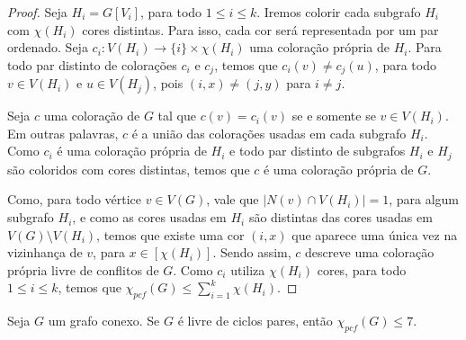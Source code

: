 \documentclass[12pt]{article}
\begin{document}
\begin{proof}
	
 Seja $H_i = G[V_i]$, para todo $1 \leq i \leq k$. Iremos colorir cada subgrafo $H_i$ com $\chi(H_i)$ cores distintas. Para isso, cada cor será representada por um par ordenado. Seja $c_i: V(H_i) \rightarrow \{ i \} \times \chi(H_i)$ uma coloração própria de $H_i$. Para todo par distinto de colorações $c_i$ e $c_j$, temos que $c_i(v) \neq c_j(u)$, para todo $ v \in V(H_i)$ e $ u \in V(H_j)$, pois $(i, x) \neq (j, y)$ para $i \neq j$.\newl
  
  Seja $c$ uma coloração de $G$ tal que $c(v) = c_i(v)$ se e somente se $v \in V(H_i)$. Em outras palavras, $c$ é a união das colorações usadas em cada subgrafo $H_i$. Como $c_i$ é uma coloração própria de $H_i$ e todo par distinto de subgrafos $H_i$ e $H_j$ são coloridos com cores distintas, temos que $c$ é uma coloração própria de $G$. \newl
 
  Como, para todo vértice $v \in V(G)$, vale que $|N(v) \cap V(H_i)| = 1$, para algum subgrafo $H_i$, e como as cores usadas em $H_i$ são distintas das cores usadas em $V(G)\setminus V(H_i)$, temos que existe uma cor $(i, x)$ que aparece uma única vez na vizinhança de $v$, para $x \in [\chi(H_i)]$. Sendo assim, $c$ descreve uma coloração própria livre de conflitos de $G$. Como $c_i$ utiliza $\chi(H_i)$ cores, para todo $1 \leq i \leq k$, temos que $\chi_{pcf}(G) \leq \sum\limits_{i = 1}^{k} \chi(H_i)$. 
  
\end{proof} 


 \begin{teo}
 \label{teo1}
 	Seja $G$ um grafo conexo. Se $G$ é livre de ciclos pares, então $\chi_{pcf}(G) \leq 7$.
 \end{teo}
 
\end{document}
